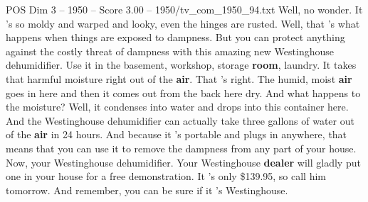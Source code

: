 \begin{textsample}{POS Dim 3 – 1950 – Score 3.00 – 1950/tv\_com\_1950\_94.txt}  \label{ex:f3_pos_019}
Well, no wonder.
It 's so moldy and warped and looky, even the hinges are rusted.
Well, that 's what happens when things are exposed to dampness.
But you can protect anything against the costly threat of dampness with this amazing new Westinghouse dehumidifier.
Use it in the basement, workshop, storage \textbf{room}, laundry.
It takes that harmful moisture right out of the \textbf{air}.
That 's right.
The humid, moist \textbf{air} goes in here and then it comes out from the back here dry.
And what happens to the moisture?
Well, it condenses into water and drops into this container here.
And the Westinghouse dehumidifier can actually take three gallons of water out of the \textbf{air} in 24 hours.
And because it 's portable and plugs in anywhere, that means that you can use it to remove the dampness from any part of your house.
Now, your Westinghouse dehumidifier.
Your Westinghouse \textbf{dealer} will gladly put one in your house for a free demonstration.
It 's only \$139.95, so call him tomorrow.
And remember, you can be sure if it 's Westinghouse.

\end{textsample}
